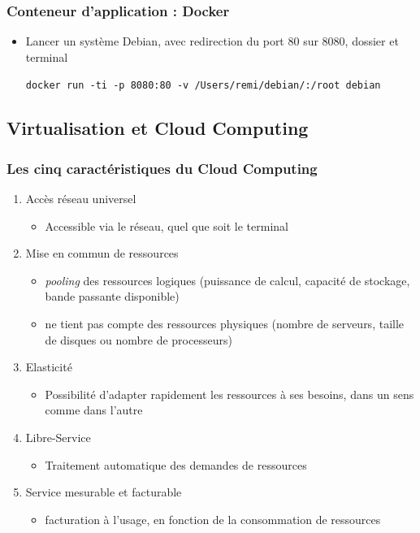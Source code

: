 \begin{frame}
\frametitle{Conteneur d'application : Docker}
\begin{itemize}
\item Lancer un système Debian, avec redirection du port 80 sur 8080, dossier et terminal

\texttt{docker run -ti -p 8080:80 -v /Users/remi/debian/:/root debian}
\end{itemize}
\end{frame}

\subsection{Virtualisation et Cloud Computing}

\begin{frame}
\frametitle{Les cinq caractéristiques du Cloud Computing \cite{intro-cloud}}
\begin{enumerate}
\item <1>Accès réseau universel
\begin{itemize}
\item Accessible via le réseau, quel que soit le terminal
\end{itemize}
\item <2>Mise en commun de ressources
\begin{itemize}
\item \textit{pooling} des ressources logiques (puissance de calcul, capacité de stockage, bande passante disponible)
\item ne tient pas compte des ressources physiques (nombre de serveurs, taille de disques ou nombre de processeurs)
\end{itemize}
\item <3>Elasticité
\begin{itemize}
\item Possibilité d'adapter rapidement les ressources à ses besoins, dans un sens comme dans l'autre
\end{itemize}
\item <4>Libre-Service
\begin{itemize}
\item Traitement automatique des demandes de ressources
\end{itemize}
\item <5>Service mesurable et facturable
\begin{itemize}
\item facturation à l'usage, en fonction de la consommation de ressources
\end{itemize}
\end{enumerate}
\end{frame}

